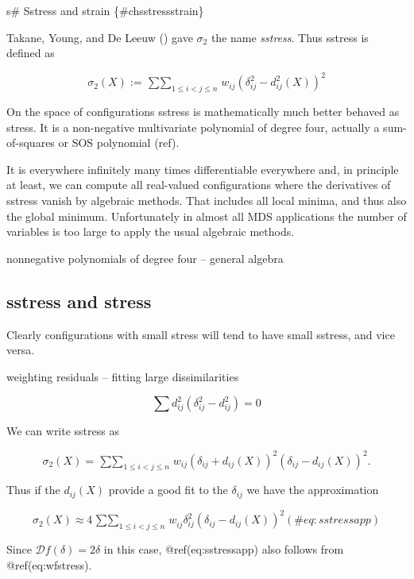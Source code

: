 \documentclass[
  12pt,
  letterpaper,
  DIV=11,
  numbers=noendperiod]{scrreprt}
\theoremstyle{remark}
\begin{document}
s\# Sstress and strain \{\#chsstressstrain\}

Takane, Young, and De Leeuw
() gave \(\sigma_2\) the
name \emph{sstress}. Thus sstress is defined as

\[
\sigma_2(X):=\mathop{\sum\sum}_{1\leq i<j\leq n}w_{ij}(\delta_{ij}^2-d_{ij}^2(X))^2
\]

On the space of configurations sstress is mathematically much better
behaved as stress. It is a non-negative multivariate polynomial of
degree four, actually a sum-of-squares or SOS polynomial (ref).

It is everywhere infinitely many times differentiable everywhere and, in
principle at least, we can compute all real-valued configurations where
the derivatives of sstress vanish by algebraic methods. That includes
all local minima, and thus also the global minimum. Unfortunately in
almost all MDS applications the number of variables is too large to
apply the usual algebraic methods.

nonnegative polynomials of degree four -- general algebra

\subsection{sstress and stress}\label{sstress-and-stress}

Clearly configurations with small stress will tend to have small
sstress, and vice versa.

weighting residuals -- fitting large dissimilarities

\[
\sum d_{ij}^2(\delta_{ij}^2-d_{ij}^2)=0
\]

We can write sstress as

\begin{equation}
\sigma_2(X)=\mathop{\sum\sum}_{1\leq i<j\leq n}w_{ij}(\delta_{ij}+d_{ij}(X))^2(\delta_{ij}-d_{ij}(X))^2.
\end{equation}

Thus if the \(d_{ij}(X)\) provide a good fit to the \(\delta_{ij}\) we
have the approximation

\begin{equation}
\sigma_2(X)\approx 4\mathop{\sum\sum}_{1\leq i<j\leq  n}w_{ij}^{\ }\delta_{ij}^2(\delta_{ij}-d_{ij}(X))^2
(\#eq:sstressapp)
\end{equation}

Since \(\mathcal{D}f(\delta)=2\delta\) in this case, @ref(eq:sstressapp)
also follows from @ref(eq:wfstress).
\end{document}
